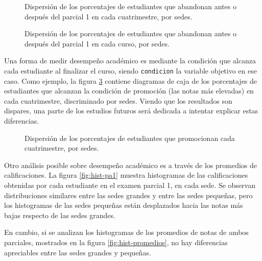 \documentclass[a4paper,11pt,dvipsnames]{article}
\begin{document}
\begin{figure}[!t]
    \begin{center}
        
    \end{center}
    \caption{Dispersión de los porcentajes de estudiantes que abandonan antes o después del parcial 1 en cada cuatrimestre, por sedes.}
    \label{fig:box-cuat}
\end{figure}

\begin{figure}[!h]
    \begin{center}
        
    \end{center}
    \caption{Dispersión de los porcentajes de estudiantes que abandonan antes o después del parcial 1 en cada curso, por sedes.}
    \label{fig:box-curso}
\end{figure}\clearpage


Una forma de medir desempeño académico es mediante la condición que alcanza cada estudiante al finalizar el curso, siendo \texttt{condicion} la variable objetivo en ese caso. Como ejemplo, la figura \ref{fig:box-promo} contiene diagramas de caja de los porcentajes de estudiantes que alcanzan la condición de promoción (las notas más elevadas) en cada cuatrimestre, discriminado por sedes. Viendo que los resultados son dispares, una parte de los estudios futuros será dedicada a intentar explicar estas diferencias.

\begin{figure}[!h]
    \begin{center}
        
    \end{center}
    \caption{Dispersión de los porcentajes de estudiantes que promocionan cada cuatrimestre, por sedes.}
    \label{fig:box-promo}
\end{figure}

Otro análisis posible sobre desempeño académico es a través de los promedios de calificaciones. La figura \ref{fig:hist-pa1} muestra histogramas de las calificaciones obtenidas por cada estudiante en el examen parcial 1, en cada sede. Se observan distribuciones similares entre las sedes grandes y entre las sedes pequeñas, pero los histogramas de las sedes pequeñas están desplazados hacia las notas más bajas respecto de las sedes grandes.\par\medskip

En cambio, si se analizan los histogramas de los promedios de notas de ambos parciales, mostrados en la figura \ref{fig:hist-promedios}, no hay diferencias apreciables entre las sedes grandes y pequeñas.\par\medskip
\end{document}
